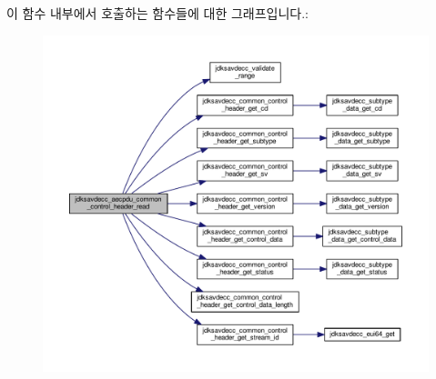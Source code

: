 이 함수 내부에서 호출하는 함수들에 대한 그래프입니다.\+:
\nopagebreak
\begin{figure}[H]
\begin{center}
\leavevmode
\includegraphics[width=350pt]{group__aecpdu_gae8aa0713d6c447632579d077bb12c19f_cgraph}
\end{center}
\end{figure}




